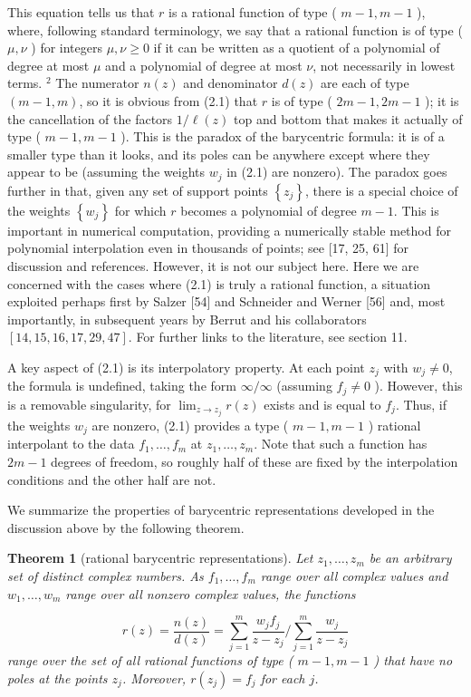 \documentclass[11pt]{article}
\newtheorem{theorem}{Theorem}[section]
\theoremstyle{definition}
\begin{document}
    
    This equation tells us that $r$ is a rational function of type ( $m-1, m-1$ ), where, following standard terminology, we say that a rational function is of type ( $\mu, \nu$ ) for integers $\mu, \nu \geq 0$ if it can be written as a quotient of a polynomial of degree at most $\mu$ and a polynomial of degree at most $\nu$, not necessarily in lowest terms. ${ }^{2}$ The numerator $n(z)$ and denominator $d(z)$ are each of type $(m-1, m)$, so it is obvious from (2.1) that $r$ is of type ( $2 m-1,2 m-1$ ); it is the cancellation of the factors $1 / \ell(z)$ top and bottom that makes it actually of type ( $m-1, m-1$ ). This is the paradox of the barycentric formula: it is of a smaller type than it looks, and its poles can be anywhere except where they appear to be (assuming the weights $w_{j}$ in (2.1) are nonzero). The paradox goes further in that, given any set of support points $\left\{z_{j}\right\}$, there is a special choice of the weights $\left\{w_{j}\right\}$ for which $r$ becomes a polynomial of degree $m-1$. This is important in numerical computation, providing a numerically stable method for polynomial interpolation even in thousands of points; see [17, 25, 61] for discussion and references. However, it is not our subject here. Here we are concerned with the cases where (2.1) is truly a rational function, a situation exploited perhaps first by Salzer [54] and Schneider and Werner [56] and, most importantly, in subsequent years by Berrut and his collaborators $[14,15,16,17,29,47]$. For further links to the literature, see section 11.
    
    A key aspect of (2.1) is its interpolatory property. At each point $z_{j}$ with $w_{j} \neq 0$, the formula is undefined, taking the form $\infty / \infty$ (assuming $f_{j} \neq 0$ ). However, this is a removable singularity, for $\lim _{z \rightarrow z_{j}} r(z)$ exists and is equal to $f_{j}$. Thus, if the weights $w_{j}$ are nonzero, (2.1) provides a type ( $m-1, m-1$ ) rational interpolant to the data $f_{1}, \ldots, f_{m}$ at $z_{1}, \ldots, z_{m}$. Note that such a function has $2 m-1$ degrees of freedom, so roughly half of these are fixed by the interpolation conditions and the other half are not.
    
    We summarize the properties of barycentric representations developed in the discussion above by the following theorem.
    
    \begin{theorem}[rational barycentric representations]
        Let $z_{1}, \ldots, z_{m}$ be an arbitrary set of distinct complex numbers. As $f_{1}, \ldots, f_{m}$ range over all complex values and $w_{1}, \ldots, w_{m}$ range over all nonzero complex values, the functions
    

    \begin{equation*}
    r(z)=\frac{n(z)}{d(z)}=\sum_{j=1}^{m} \frac{w_{j} f_{j}}{z-z_{j}} / \sum_{j=1}^{m} \frac{w_{j}}{z-z_{j}} \tag{2.5}
    \end{equation*}
    range over the set of all rational functions of type ( $m-1, m-1$ ) that have no poles at the points $z_{j}$. Moreover, $r\left(z_{j}\right)=f_{j}$ for each $j$.
    \end{theorem}
    
\end{document}
